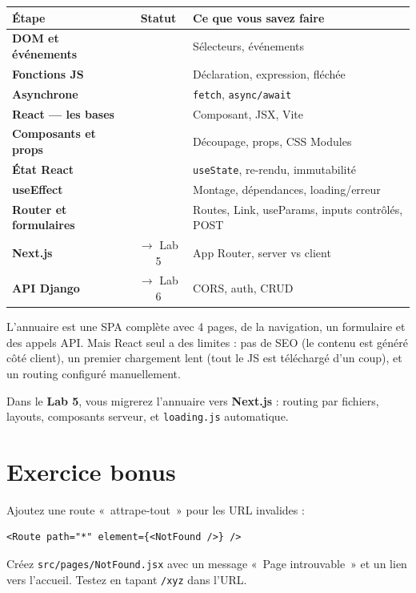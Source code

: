 \documentclass[11pt,a4paper]{article}
\newcommand{\cmark}{\ding{51}}
\begin{document}
\begin{center}
\begin{tabular}{lcp{7cm}}
\toprule
\textbf{Étape} & \textbf{Statut} & \textbf{Ce que vous savez faire} \\
\midrule
\textbf{DOM et événements} & \cmark{} & Sélecteurs, événements \\
\textbf{Fonctions JS} & \cmark{} & Déclaration, expression, fléchée \\
\textbf{Asynchrone} & \cmark{} & \texttt{fetch}, \texttt{async/await} \\
\textbf{React --- les bases} & \cmark{} & Composant, JSX, Vite \\
\textbf{Composants et props} & \cmark{} & Découpage, props, CSS Modules \\
\textbf{État React} & \cmark{} & \texttt{useState}, re-rendu, immutabilité \\
\textbf{useEffect} & \cmark{} & Montage, dépendances, loading/erreur \\
\textbf{Router et formulaires} & \cmark{} & Routes, Link, useParams, inputs contrôlés, POST \\
\textbf{Next.js} & $\to$ Lab 5 & App Router, server vs client \\
\textbf{API Django} & $\to$ Lab 6 & CORS, auth, CRUD \\
\bottomrule
\end{tabular}
\end{center}

\begin{projetbox}[Et ensuite ?]
L'annuaire est une SPA complète avec 4 pages, de la navigation, un formulaire et des appels API. Mais React seul a des limites : pas de SEO (le contenu est généré côté client), un premier chargement lent (tout le JS est téléchargé d'un coup), et un routing configuré manuellement.

Dans le \textbf{Lab 5}, vous migrerez l'annuaire vers \textbf{Next.js} : routing par fichiers, layouts, composants serveur, et \texttt{loading.js} automatique.
\end{projetbox}

\section*{Exercice bonus}

\begin{infobox}
Ajoutez une route «~attrape-tout~» pour les URL invalides :
\begin{lstlisting}
<Route path="*" element={<NotFound />} />
\end{lstlisting}
Créez \texttt{src/pages/NotFound.jsx} avec un message «~Page introuvable~» et un lien vers l'accueil. Testez en tapant \texttt{/xyz} dans l'URL.
\end{infobox}
\end{document}
